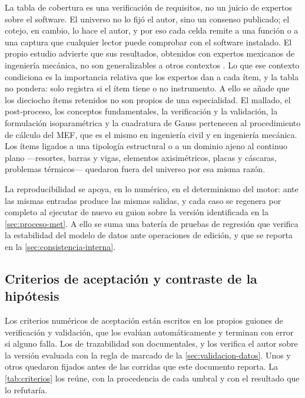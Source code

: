 La tabla de cobertura es una verificación de requisitos, no un juicio de expertos sobre el software. El universo no lo fijó el autor, sino un consenso publicado; el cotejo, en cambio, lo hace el autor, y por eso cada celda remite a una función o a una captura que cualquier lector puede comprobar con el software instalado. El propio estudio advierte que sus resultados, obtenidos con expertos mexicanos de ingeniería mecánica, no son generalizables a otros contextos \autocite[p.~1171]{perezsantiago2023fem}. Lo que ese contexto condiciona es la importancia relativa que los expertos dan a cada ítem, y la tabla no pondera: solo registra si el ítem tiene o no instrumento. A ello se añade que los dieciocho ítems retenidos no son propios de una especialidad. El mallado, el post-proceso, los conceptos fundamentales, la verificación y la validación, la formulación isoparamétrica y la cuadratura de Gauss pertenecen al procedimiento de cálculo del MEF, que es el mismo en ingeniería civil y en ingeniería mecánica. Los ítems ligados a una tipología estructural o a un dominio ajeno al continuo plano —resortes, barras y vigas, elementos axisimétricos, placas y cáscaras, problemas térmicos— quedaron fuera del universo por esa misma razón.

La reproducibilidad se apoya, en lo numérico, en el determinismo del motor: ante las mismas entradas produce las mismas salidas, y cada caso se regenera por completo al ejecutar de nuevo su guion sobre la versión identificada en la \autoref{sec:proceso-met}. A ello se suma una batería de pruebas de regresión que verifica la estabilidad del modelo de datos ante operaciones de edición, y que se reporta en la \autoref{sec:consistencia-interna}.

\subsection{Criterios de aceptación y contraste de la hipótesis}
\label{sec:validacion-resultados}

Los criterios numéricos de aceptación están escritos en los propios guiones de verificación y validación, que los evalúan automáticamente y terminan con error si alguno falla. Los de trazabilidad son documentales, y los verifica el autor sobre la versión evaluada con la regla de marcado de la \autoref{sec:validacion-datos}. Unos y otros quedaron fijados antes de las corridas que este documento reporta. La \autoref{tab:criterios} los reúne, con la procedencia de cada umbral y con el resultado que lo refutaría.

